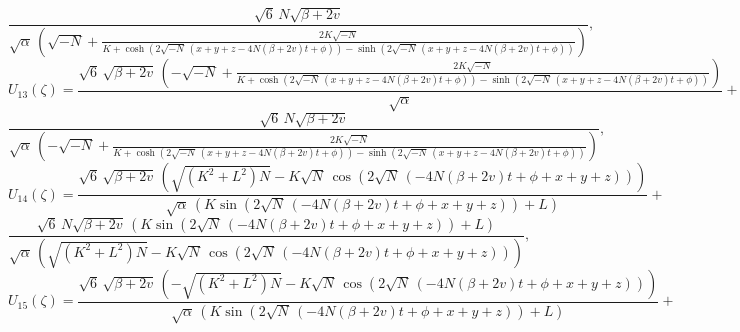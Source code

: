 \documentclass{article}
\numberwithin{equation}{section}
\begin{document}
\begin{equation}\frac{\sqrt{6}\, N \sqrt{\beta +2 v}}{\sqrt{\alpha}\, \left(\sqrt{-N}+\frac{2 K \sqrt{-N}}{K +\cosh \left(2 \sqrt{-N}\, \left(x +y +z -4 N \left(\beta +2 v \right) t +\phi \right)\right)-\sinh \left(2 \sqrt{-N}\, \left(x +y +z -4 N \left(\beta +2 v \right) t +\phi \right)\right)}\right)},
\end{equation}
\begin{equation}\label{U13}
    U_{13}\! \left(\zeta \right) =
\frac{\sqrt{6}\, \sqrt{\beta +2 v}\, \left(-\sqrt{-N}+\frac{2 K \sqrt{-N}}{K +\cosh \left(2 \sqrt{-N}\, \left(x +y +z -4 N \left(\beta +2 v \right) t +\phi \right)\right)-\sinh \left(2 \sqrt{-N}\, \left(x +y +z -4 N \left(\beta +2 v \right) t +\phi \right)\right)}\right)}{\sqrt{\alpha}}+\nonumber
\end{equation}
\begin{equation}
\frac{\sqrt{6}\, N \sqrt{\beta +2 v}}{\sqrt{\alpha}\, \left(-\sqrt{-N}+\frac{2 K \sqrt{-N}}{K +\cosh \left(2 \sqrt{-N}\, \left(x +y +z -4 N \left(\beta +2 v \right) t +\phi \right)\right)-\sinh \left(2 \sqrt{-N}\, \left(x +y +z -4 N \left(\beta +2 v \right) t +\phi \right)\right)}\right)},
\end{equation}
\begin{equation}\label{U14}
    U_{14}\! \left(\zeta \right) =
\frac{\sqrt{6}\, \sqrt{\beta +2 v}\, \left(\sqrt{\left(K^{2}+L^{2}\right) N}-K \sqrt{N}\, \cos \! \left(2 \sqrt{N}\, \left(-4 N \left(\beta +2 v \right) t +\phi +x +y +z \right)\right)\right)}{\sqrt{\alpha}\, \left(K \sin \! \left(2 \sqrt{N}\, \left(-4 N \left(\beta +2 v \right) t +\phi +x +y +z \right)\right)+L \right)}+\nonumber
\end{equation}
\begin{equation}
\frac{\sqrt{6}\, N \sqrt{\beta +2 v}\, \left(K \sin \! \left(2 \sqrt{N}\, \left(-4 N \left(\beta +2 v \right) t +\phi +x +y +z \right)\right)+L \right)}{\sqrt{\alpha}\, \left(\sqrt{\left(K^{2}+L^{2}\right) N}-K \sqrt{N}\, \cos \! \left(2 \sqrt{N}\, \left(-4 N \left(\beta +2 v \right) t +\phi +x +y +z \right)\right)\right)},
\end{equation}
\begin{equation}\label{U15}
    U_{15}\! \left(\zeta \right) =
\frac{\sqrt{6}\, \sqrt{\beta +2 v}\, \left(-\sqrt{\left(K^{2}+L^{2}\right) N}-K \sqrt{N}\, \cos \! \left(2 \sqrt{N}\, \left(-4 N \left(\beta +2 v \right) t +\phi +x +y +z \right)\right)\right)}{\sqrt{\alpha}\, \left(K \sin \! \left(2 \sqrt{N}\, \left(-4 N \left(\beta +2 v \right) t +\phi +x +y +z \right)\right)+L \right)}+\nonumber
\end{equation}
\end{document}

